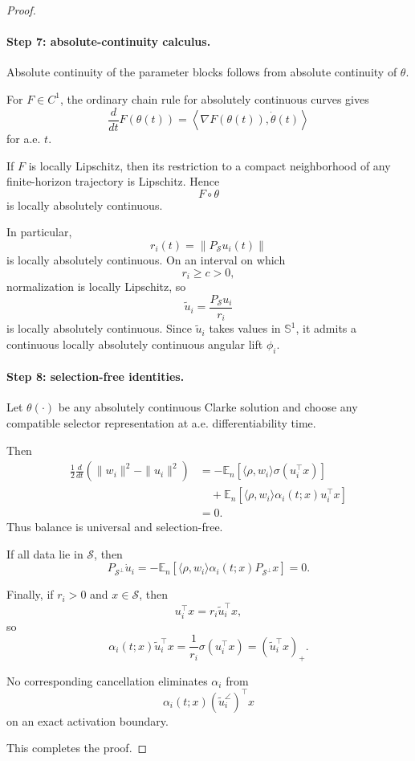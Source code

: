 \documentclass{article} %
\theoremstyle{plain}
\theoremstyle{definition}
\theoremstyle{remark}
\begin{document}
\begin{proof}
\paragraph{Step 7: absolute-continuity calculus.}

Absolute continuity of the parameter blocks follows from absolute continuity
of $\theta$.

For $F\in C^1$, the ordinary chain rule for absolutely continuous curves
gives
\[
\frac{d}{dt}F(\theta(t))
=
\left\langle
\nabla F(\theta(t)),
\dot\theta(t)
\right\rangle
\]
for a.e. $t$.

If $F$ is locally Lipschitz, then its restriction to a compact neighborhood
of any finite-horizon trajectory is Lipschitz. Hence
\[
F\circ\theta
\]
is locally absolutely continuous.

In particular,
\[
r_i(t)
=
\|P_{\mathcal S}u_i(t)\|
\]
is locally absolutely continuous. On an interval on which
\[
r_i\ge c>0,
\]
normalization is locally Lipschitz, so
\[
\widetilde u_i
=
\frac{P_{\mathcal S}u_i}{r_i}
\]
is locally absolutely continuous. Since $\widetilde u_i$ takes values in
$\mathbb S^1$, it admits a continuous locally absolutely continuous angular
lift $\phi_i$.

\paragraph{Step 8: selection-free identities.}

Let $\theta(\cdot)$ be any absolutely continuous Clarke solution and choose
any compatible selector representation at a.e. differentiability time.

Then
\[
\begin{aligned}
\frac12
\frac{d}{dt}
\left(
\|w_i\|^2-\|u_i\|^2
\right)
&=
-
\mathbb E_n
\left[
\langle\rho,w_i\rangle
\sigma(u_i^\top x)
\right]
\\
&\quad+
\mathbb E_n
\left[
\langle\rho,w_i\rangle
\alpha_i(t;x)
u_i^\top x
\right]
\\
&=0.
\end{aligned}
\]
Thus balance is universal and selection-free.

If all data lie in $\mathcal S$, then
\[
P_{\mathcal S^\perp}\dot u_i
=
-
\mathbb E_n
\left[
\langle\rho,w_i\rangle
\alpha_i(t;x)
P_{\mathcal S^\perp}x
\right]
=
0.
\]

Finally, if $r_i>0$ and $x\in\mathcal S$, then
\[
u_i^\top x
=
r_i
\widetilde u_i^\top x,
\]
so
\[
\alpha_i(t;x)
\widetilde u_i^\top x
=
\frac1{r_i}
\sigma(u_i^\top x)
=
(\widetilde u_i^\top x)_+.
\]

No corresponding cancellation eliminates $\alpha_i$ from
\[
\alpha_i(t;x)
(\widetilde u_i^\angle)^\top x
\]
on an exact activation boundary.

This completes the proof.
\end{proof}
\end{document}
